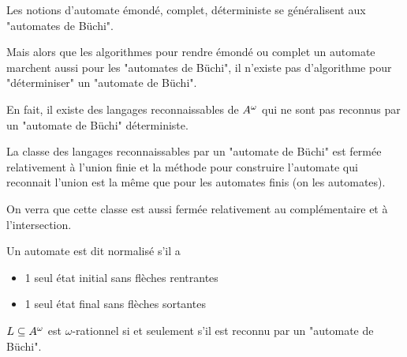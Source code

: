 Les notions d'automate émondé, complet, déterministe se généralisent aux "automates de Büchi".


Mais alors que les algorithmes pour rendre émondé ou complet un automate marchent aussi
pour les "automates de Büchi", il n'existe pas d'algorithme pour "déterminiser" un "automate de Büchi".

En fait, il existe des langages reconnaissables de $A^{\omega}$ qui ne sont pas reconnus par un "automate de Büchi" déterministe.


La classe des langages reconnaissables par un "automate de Büchi" est fermée relativement à l'union finie
et la méthode pour construire l'automate qui reconnait l'union est la même que pour les automates finis (on 
les automates).

On verra que cette classe est aussi fermée relativement au complémentaire et à l'intersection.


\begin{definition}
	Un automate est dit normalisé s'il a

	\begin{itemize}
		\item 1 seul état initial sans flèches rentrantes
		\item 1 seul état final sans flèches sortantes
	\end{itemize}
\end{definition}

\begin{theorem}
	$L \subseteq A^{\omega}$ est $\omega$-rationnel si et seulement s'il est reconnu par un "automate de Büchi".
\end{theorem}

